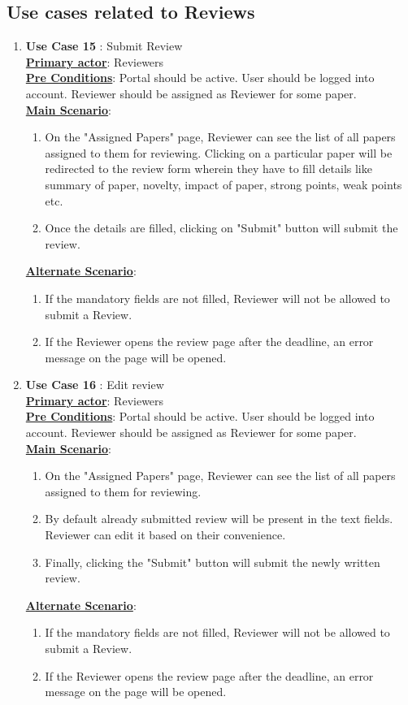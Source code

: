 \documentclass[english,a4paper,12pt]{report}
\begin{document}
\subsection{Use cases related to Reviews}
\begin{enumerate}
    \item \textbf{Use Case 15 }: Submit Review \\
\underline{\textbf{Primary actor}}: Reviewers\\
\underline{\textbf{Pre Conditions}}: Portal should be active. User should be logged into account. Reviewer should be assigned as Reviewer for some paper.\\
\underline{\textbf{Main Scenario}}:
\begin{enumerate}
    \item On the "Assigned Papers" page, Reviewer can see the list of all papers assigned to them for reviewing. Clicking on a particular paper will be redirected to the review form wherein they have to fill details like summary of paper, novelty, impact of paper, strong points, weak points etc.
    \item Once the details are filled, clicking on "Submit" button will submit the review.
\end{enumerate}
\underline{\textbf{Alternate Scenario}}:
\begin{enumerate}
    \item If the mandatory fields are not filled, Reviewer will not be allowed to submit a Review.
    \item If the Reviewer opens the review page after the deadline, an error message on the page will be opened.
\end{enumerate}

\item \textbf{Use Case 16 }: Edit review \\
\underline{\textbf{Primary actor}}: Reviewers\\
\underline{\textbf{Pre Conditions}}: Portal should be active. User should be logged into account. Reviewer should be assigned as Reviewer for some paper.\\
\underline{\textbf{Main Scenario}}:
\begin{enumerate}
    \item On the "Assigned Papers" page, Reviewer can see the list of all papers assigned to them for reviewing. 
    \item By default already submitted review will be present in the text fields. Reviewer can edit it based on their convenience.
    \item Finally, clicking the "Submit" button will submit the newly written review.
\end{enumerate}
\underline{\textbf{Alternate Scenario}}:
\begin{enumerate}
    \item If the mandatory fields are not filled, Reviewer will not be allowed to submit a Review.
    \item If the Reviewer opens the review page after the deadline, an error message on the page will be opened.
\end{enumerate}




\end{enumerate}
\end{document}
